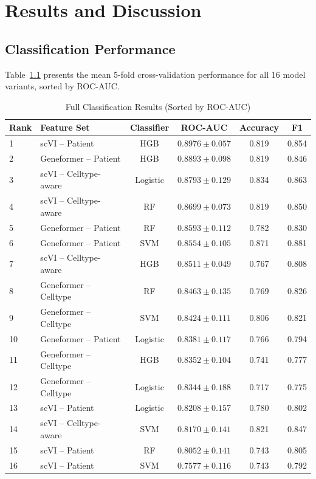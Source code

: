 \chapter{Results and Discussion}
\label{chap:results}

\section{Classification Performance}

Table~\ref{tab:full_results} presents the mean 5-fold cross-validation performance for all 16 model variants, sorted by ROC-AUC.

\begin{table}[h!]
\centering
\caption{Full Classification Results (Sorted by ROC-AUC)}
\label{tab:full_results}
\begin{tabular}{llcccc}
\toprule
\textbf{Rank} & \textbf{Feature Set} & \textbf{Classifier} & \textbf{ROC-AUC} & \textbf{Accuracy} & \textbf{F1} \\
\midrule
1  & scVI -- Patient          & HGB         & $0.8976 \pm 0.057$ & 0.819 & 0.854 \\
2  & Geneformer -- Patient    & HGB         & $0.8893 \pm 0.098$ & 0.819 & 0.846 \\
3  & scVI -- Celltype-aware   & Logistic    & $0.8793 \pm 0.129$ & 0.834 & 0.863 \\
4  & scVI -- Celltype-aware   & RF          & $0.8699 \pm 0.073$ & 0.819 & 0.850 \\
5  & Geneformer -- Patient    & RF          & $0.8593 \pm 0.112$ & 0.782 & 0.830 \\
6  & Geneformer -- Patient    & SVM         & $0.8554 \pm 0.105$ & 0.871 & 0.881 \\
7  & scVI -- Celltype-aware   & HGB         & $0.8511 \pm 0.049$ & 0.767 & 0.808 \\
8  & Geneformer -- Celltype   & RF          & $0.8463 \pm 0.135$ & 0.769 & 0.826 \\
9  & Geneformer -- Celltype   & SVM         & $0.8424 \pm 0.111$ & 0.806 & 0.821 \\
10 & Geneformer -- Patient    & Logistic    & $0.8381 \pm 0.117$ & 0.766 & 0.794 \\
11 & Geneformer -- Celltype   & HGB         & $0.8352 \pm 0.104$ & 0.741 & 0.777 \\
12 & Geneformer -- Celltype   & Logistic    & $0.8344 \pm 0.188$ & 0.717 & 0.775 \\
13 & scVI -- Patient          & Logistic    & $0.8208 \pm 0.157$ & 0.780 & 0.802 \\
14 & scVI -- Celltype-aware   & SVM         & $0.8170 \pm 0.141$ & 0.821 & 0.847 \\
15 & scVI -- Patient          & RF          & $0.8052 \pm 0.141$ & 0.743 & 0.805 \\
16 & scVI -- Patient          & SVM         & $0.7577 \pm 0.116$ & 0.743 & 0.792 \\
\bottomrule
\end{tabular}
\end{table}


